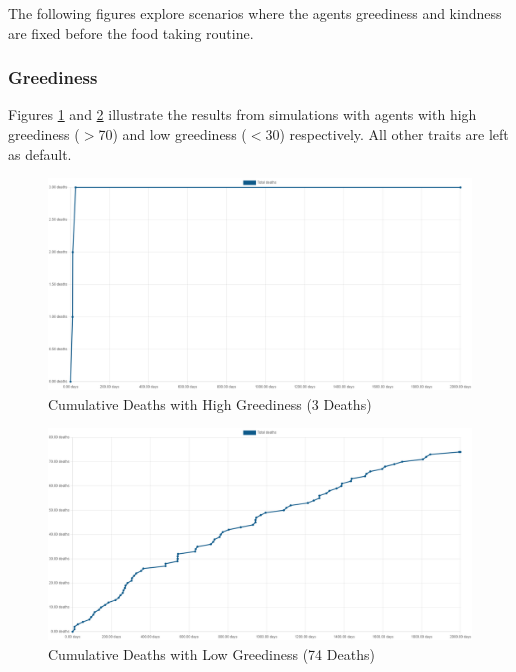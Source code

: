 \newpage
The following figures explore scenarios where the agents greediness and kindness are fixed before the food taking routine. 

\subsubsection{Greediness}
\label{subsubsec: Greediness}

Figures \ref{fig: Fixed High Greediness} and \ref{fig: Fixed Low Greediness} illustrate the results from simulations with agents with high greediness ($>$70) and low greediness ($<$30) respectively. All other traits are left as default.

\begin{figure}[H]
    \begin{center}
        \includegraphics[scale=0.25]{Images/Cumulative Deaths, fixed high greediness, T7Only, 2000days, 20food, 3deaths.png}
    \end{center}
    \caption{Cumulative Deaths with High Greediness (3 Deaths)}
    \label{fig: Fixed High Greediness}
\end{figure}

\begin{figure}[H]
    \begin{center}
        \includegraphics[scale=0.25]{Images/Cumulative Deaths, fixed low greediness, T7Only, 2000days, 20food, 74deaths.png}
    \end{center}
    \caption{Cumulative Deaths with Low Greediness (74 Deaths)}
    \label{fig: Fixed Low Greediness}
\end{figure}


